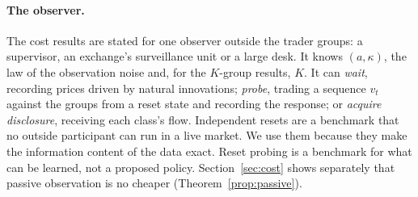 \paragraph{The observer.} The cost results are stated for one observer outside the trader groups: a supervisor, an exchange's surveillance unit or a large desk. It knows $(a,\kappa)$, the law of the observation noise and, for the $K$-group results, $K$. It can \emph{wait}, recording prices driven by natural innovations; \emph{probe}, trading a sequence $v_t$ against the groups from a reset state and recording the response; or \emph{acquire disclosure}, receiving each class's flow. Independent resets are a benchmark that no outside participant can run in a live market. We use them because they make the information content of the data exact. Reset probing is a benchmark for what can be learned, not a proposed policy. Section~\ref{sec:cost} shows separately that passive observation is no cheaper (Theorem~\ref{prop:passive}).
